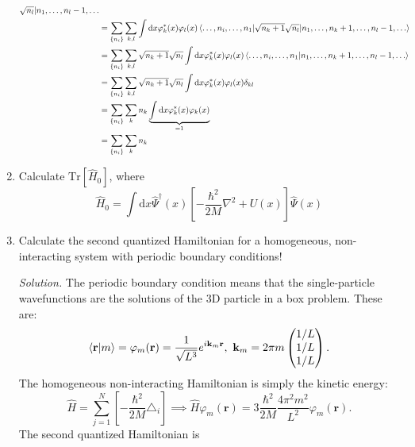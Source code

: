 \documentclass[11pt, a4paper]{article}
\newcommand{\dd}{\mathrm{d}}
\newcommand{\Tr}[1]{\mathrm{Tr}\left[#1\right]}
\begin{document}
\begin{enumerate}
\begin{align*}
{        \sqrt{n_l} |n_1, \dots, n_l-1, \dots} \\
        & = \sum\limits_{\{n_i\}}\sum\limits_{k,l}\int\dd x \varphi^*_k(x)\varphi_l(x) \braket{\dots,n_i,\dots,n_1 | 
        \sqrt{n_k+1}\sqrt{n_l} |n_1, \dots, n_k+1, \dots, n_l-1, \dots} \\
        & = \sum\limits_{\{n_i\}}\sum\limits_{k,l} \sqrt{n_k+1}\sqrt{n_l} \int\dd x \varphi^*_k(x)\varphi_l(x) \braket{\dots,n_i,\dots,n_1 |n_1, \dots, n_k+1, \dots, n_l-1, \dots} \\
        & = \sum\limits_{\{n_i\}}\sum\limits_{k,l} \sqrt{n_k+1}\sqrt{n_l} \int\dd x \varphi^*_k(x)\varphi_l(x) \delta_{kl} \\
        & = \sum\limits_{\{n_i\}}\sum\limits_{k} n_k \underbrace{\int\dd x \varphi^*_k(x)\varphi_k(x)}_{=1}\\
        & = \sum\limits_{\{n_i\}}\sum\limits_{k} n_k
    \end{align*}
    \item Calculate $\Tr {\hat H_0}$, where
    \begin{equation*}
        \hat H_0 = \int\dd x \hat\Psi^{\dagger}(x)\left[ -\frac{\hbar^2}{2M}\nabla^2 + U(x) \right]\hat\Psi(x)
    \end{equation*}
    \item Calculate the second quantized Hamiltonian for a homogeneous, non-interacting system with periodic boundary conditions!
    \par \textit{Solution.}
    The periodic boundary condition means that the single-particle wavefunctions are the solutions of the 3D particle in a box problem.
    These are:
    \begin{equation*}
        \braket{\mathbf r | m} = \varphi_m(\mathbf r) = \frac{1}{\sqrt{L^3}}e^{i\mathbf k_m \mathbf r},
        ~\mathbf k_m = 2\pi m \begin{pmatrix}
            1/L \\ 1/L \\ 1/L
        \end{pmatrix}.
    \end{equation*}
    The homogeneous non-interacting Hamiltonian is simply the kinetic energy:
    \begin{equation*}
        \hat H = \sum_{j=1}^N\left[-\frac{\hbar^2}{2M}\triangle_i\right]
        \implies \hat H \varphi_m(\mathbf r) = 3\frac{\hbar^2}{2M}\frac{4\pi^2 m^2}{L^2}\varphi_m(\mathbf r).
    \end{equation*}
    The second quantized Hamiltonian is
    \begin{align*}

\end{align*}
\end{enumerate}
\end{document}
